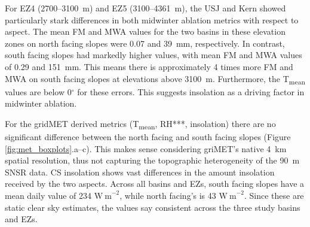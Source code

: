For EZ4 (2700--3100~m) and EZ5 (3100--4361~m), the USJ and Kern showed particularly stark differences in both midwinter ablation metrics with respect to aspect. The mean FM and MWA values for the two basins in these elevation zones on north facing slopes were 0.07 and 39~mm, respectively. In contrast, south facing slopes had markedly higher values, with mean FM and MWA values of 0.29 and 151~mm. This means there is approximately 4 times more FM and MWA on south facing slopes at elevations above 3100~m. Furthermore, the T\textsubscript{mean} values are below 0$^{\circ}$ for these errors. This suggests insolation as a driving factor in midwinter ablation.


For the gridMET derived metrics (T\textsubscript{mean}, RH***, insolation) there are no significant difference between the north facing and south facing slopes (Figure \ref{fig:met_boxplots}.a--c). This makes sense considering griMET's native 4~km spatial resolution, thus not capturing the topographic heterogeneity of the 90~m SNSR data. CS insolation shows vast differences in the amount insolation received by the two aspects. Across all basins and EZs, south facing slopes have a mean daily value of 234 $\mathrm{W~m}^{-2}$, while north facing's is 43 $\mathrm{W~m}^{-2}$. Since these are static clear sky estimates, the values say consistent across the three study basins and EZs.

